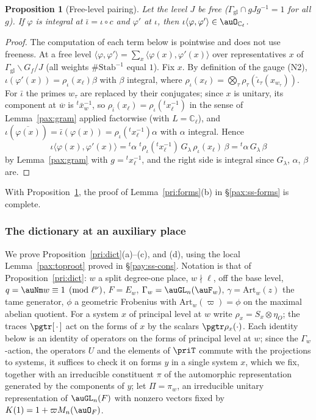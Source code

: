 \documentclass[10pt]{amsart}
\newtheorem{proposition}[theorem]{Proposition}
\theoremstyle{definition}
\theoremstyle{remark}
\newcommand{\C}{\mathbb C}
\begin{document}
\begin{proposition}[Free-level pairing]\label{pax:pairing}
Let the level $J$ be free ($\Gamma_{\mathrm{gl}}\cap gJg^{-1}=1$ for all $g$). If $\varphi$ is integral at
$\bar\iota=\iota\circ c$ and $\varphi'$ at $\iota$, then $\iota\langle\varphi,\varphi'\rangle\in
\auO_{\C_\ell}$.
\end{proposition}
\begin{proof}
The computation of each term below is pointwise and does not use freeness. At a free level $\langle\varphi,\varphi'\rangle=\sum_x\langle\varphi(x),\varphi'(x)\rangle$ over
representatives $x$ of $\Gamma_{\mathrm{gl}}\backslash G_f/J$ (all weights $\#\mathrm{Stab}^{-1}$ equal $1$). Fix
$x$. By definition of the gauge (N2), $\iota(\varphi'(x))=\rho_\iota(x_\ell)\beta$ with $\beta$
integral, where $\rho_\iota(x_\ell)=\bigotimes_\tau\rho_\tau(\hat\iota_\tau(x_{w_\tau}))$. For
$\bar\iota$ the primes $w_\tau$ are replaced by their conjugates; since $x$ is unitary, its component
at $\overline{w}$ is ${}^t\bar x_w^{-1}$, so $\rho_{\bar\iota}(x_\ell)=\rho_\iota({}^tx_\ell^{-1})$ in
the sense of Lemma~\ref{pax:gram} applied factorwise (with $L=\C_\ell$), and $\iota(\overline{
\varphi(x)})=\bar\iota(\varphi(x))=\rho_\iota({}^tx_\ell^{-1})\alpha$ with $\alpha$ integral. Hence
\[
\iota\langle\varphi(x),\varphi'(x)\rangle={}^t\alpha\;{}^t\rho_\iota({}^tx_\ell^{-1})\,G_\lambda\,
\rho_\iota(x_\ell)\,\beta={}^t\alpha\,G_\lambda\,\beta
\]
by Lemma~\ref{pax:gram} with $g={}^tx_\ell^{-1}$, and the right side is integral since
$G_\lambda$, $\alpha$, $\beta$ are.
\end{proof}

With Proposition~\ref{pax:pairing}, the proof of Lemma~\ref{pri:forms}(b) in \S\ref{pax:ss-forms} is
complete.

\subsubsection{The dictionary at an auxiliary place}\label{pax:ss-dict}

We prove Proposition~\ref{pri:dict}(a)--(c), and (d), using the local Lemma~\ref{pax:toproot}
proved in \S\ref{pay:ss-cons}. Notation is that of Proposition~\ref{pri:dict}: $w$ a split degree-one
place, $w\nmid\ell$, off the base level, $q=\auNm w\equiv1\pmod{\ell^\nu}$, $F=E_w$, $\Gamma_w=
\auGL_n(\auF_w)$, $\gamma=\mathrm{Art}_w(z)$ the tame generator, $\phi$ a geometric Frobenius with
$\mathrm{Art}_w(\varpi)=\phi$ on the maximal abelian quotient. For a system $x$ of principal level
at $w$ write $\rho_x=S_x\otimes\eta_O$; the traces $\pgtr[\,\cdot\,]$ act on the forms of $x$ by the
scalars $\pgtr\rho_x(\cdot)$. Each identity below is an identity of operators on the forms of
principal level at $w$; since the $\Gamma_w$-action, the operators $U$ and the elements of $\priT$
commute with the projections to systems, it suffices to check it on forms $y$ in a single system
$x$, which we fix, together with an irreducible constituent $\pi$ of the automorphic representation
generated by the components of $y$; let $\Pi=\pi_w$, an irreducible unitary representation of
$\auGL_n(F)$ with nonzero vectors fixed by $K(1)=1+\varpi M_n(\auO_F)$.
\end{document}
